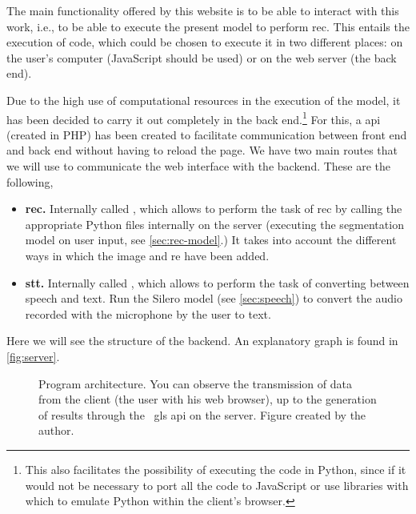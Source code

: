 The main functionality offered by this website is to be able to interact with
this work, i.e., to be able to execute the present model to perform
\gls{rec}. This entails the execution of code, which could be chosen to execute
it in two different places: on the user's computer (JavaScript should be used)
or on the web server (the back end).

Due to the high use of computational resources in the execution of the model,
it has been decided to carry it out completely in the back end.\footnote{This
  also facilitates the possibility of executing the code in Python, since if it
  would not be necessary to port all the code to JavaScript or use libraries
  with which to emulate Python within the client's browser.} For this, a
\gls{api} (created in PHP) has been created to facilitate communication between
front end and back end without having to reload the page. We have two main
routes that we will use to communicate the web interface with the
backend. These are the following,
\begin{itemize}
  \item \textbf{\gls*{rec}.} Internally called , which
  allows to perform the task of \gls{rec} by calling the appropriate Python
  files internally on the server (executing the segmentation model on user
  input, see \vref{sec:rec-model}.) It takes into account the different ways in
  which the image and \gls{re} have been added.
  \item \textbf{\gls*{stt}.} Internally called , which allows
  to perform the task of converting between speech and text. Run the Silero
  model (see \vref{sec:speech}) to convert the audio recorded with the
  microphone by the user to text.
\end{itemize}

Here we will see the structure of the backend. An explanatory graph is found in
\vref{fig:server}.

\begin{figure}[p]
  \centering
  \resizebox{\textwidth}{!}{}
  \caption[Program architecture]{Program architecture. You can observe the
    transmission of data from the client (the user with his web browser), up to
    the generation of results through the \ gls {api} on the server. Figure
    created by the author.}\label{fig:server}
\end{figure}
